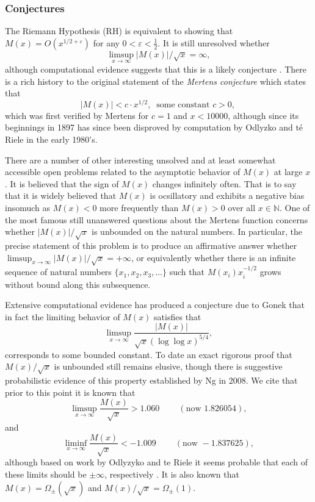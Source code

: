 \documentclass[11pt,reqno,a4letter]{article}
\numberwithin{figure}{section}
\numberwithin{table}{section}
\newcommand{\cf}{\textit{cf.\ }}
\theoremstyle{plain}
\numberwithin{theorem}{section}
\theoremstyle{definition}
\begin{document}
\subsubsection{Conjectures} 

The Riemann Hypothesis (RH) is equivalent to showing that 
$M(x) = O\left(x^{1/2+\varepsilon}\right)$ for any 
$0 < \varepsilon < \frac{1}{2}$. 
It is still unresolved whether 
\[ 
\limsup_{x\rightarrow\infty} |M(x)| / \sqrt{x} = \infty, 
\] 
although computational evidence suggests that this is a likely conjecture 
\cite{ORDER-MERTENSFN,HURST-2017}. 
There is a rich history to the original statement of the \emph{Mertens conjecture} which 
states that 
\[ 
|M(x)| < c \cdot x^{1/2},\ \text{ some constant $c > 0$, }
\] 
which was first verified by Mertens for $c = 1$ and $x < 10000$, 
although since its beginnings in 1897 has since been disproved by computation by 
Odlyzko and t\'{e} Riele in the early 1980's. 

There are a number of other interesting unsolved and at 
least somewhat accessible open problems 
related to the asymptotic behavior of $M(x)$ at large $x$. 
It is believed that the sign of $M(x)$ changes infinitely often. 
That is to say that it is widely believed that $M(x)$ is 
ocsillatory and exhibits a negative bias insomuch as 
$M(x) < 0$ more frequently than $M(x) > 0$ over all 
$x \in \mathbb{N}$. 
One of the most famous still unanswered questions about the Mertens 
function concerns whether $|M(x)| / \sqrt{x}$ is unbounded on the 
natural numbers. In particular, the precise statement of this 
problem is to produce an affirmative answer whether 
$\limsup_{x \rightarrow \infty} |M(x)| / \sqrt{x} = +\infty$, or 
equivalently whether there is an infinite sequence of natural numbers 
$\{x_1, x_2, x_3, \ldots\}$ such that $M(x_i) x_i^{-1/2}$ grows without 
bound along this subsequence. 

Extensive computational evidence has produced 
a conjecture due to Gonek that in fact the limiting behavior of 
$M(x)$ satisfies 
that $$\limsup_{x \rightarrow \infty} \frac{|M(x)|}{\sqrt{x} 
(\log\log x)^{5/4}},$$ 
corresponds to some bounded constant. 
To date an exact rigorous 
proof that $M(x) / \sqrt{x}$ is unbounded still remains elusive, though there is suggestive probabilistic 
evidence of this property established by Ng in 2008. 
We cite that prior to this point it is known that \cite[\cf \S 4.1]{PRIMEREC} 
\[
\limsup_{x\rightarrow\infty} \frac{M(x)}{\sqrt{x}} > 1.060\ \qquad (\text{now } 1.826054), 
\] 
and 
\[ 
\liminf_{x\rightarrow\infty} \frac{M(x)}{\sqrt{x}} < -1.009\ \qquad (\text{now } -1.837625), 
\] 
although based on work by Odlyzyko and te Riele it seems probable that 
each of these limits should be $\pm \infty$, respectively 
\cite{ODLYZ-TRIELE,MREVISITED,ORDER-MERTENSFN,HURST-2017}. 
It is also known that $M(x) = \Omega_{\pm}(\sqrt{x})$ and 
$M(x) / \sqrt{x} = \Omega_{\pm}(1)$. 
\end{document}
